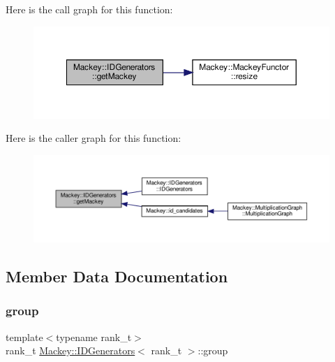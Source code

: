 Here is the call graph for this function\+:\nopagebreak
\begin{figure}[H]
\begin{center}
\leavevmode
\includegraphics[width=350pt]{classMackey_1_1IDGenerators_a9669af6c07a9ed5a91a662aef6cda1ed_cgraph}
\end{center}
\end{figure}
Here is the caller graph for this function\+:\nopagebreak
\begin{figure}[H]
\begin{center}
\leavevmode
\includegraphics[width=350pt]{classMackey_1_1IDGenerators_a9669af6c07a9ed5a91a662aef6cda1ed_icgraph}
\end{center}
\end{figure}


\subsection{Member Data Documentation}
\mbox{\label{classMackey_1_1IDGenerators_a0542bce4c4bcc9037146e04e6fe1d350}} 
\subsubsection{\texorpdfstring{group}{group}}
{\footnotesize\ttfamily template$<$typename rank\+\_\+t$>$ \\
rank\+\_\+t \hyperlink{classMackey_1_1IDGenerators}{Mackey\+::\+I\+D\+Generators}$<$ rank\+\_\+t $>$\+::group}



